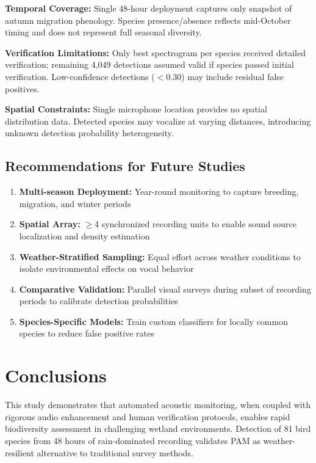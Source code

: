\documentclass[twocolumn]{article}
\begin{document}
\textbf{Temporal Coverage:} Single 48-hour deployment captures only snapshot of autumn migration phenology. Species presence/absence reflects mid-October timing and does not represent full seasonal diversity.

\textbf{Verification Limitations:} Only best spectrogram per species received detailed verification; remaining 4,049 detections assumed valid if species passed initial verification. Low-confidence detections ($<$0.30) may include residual false positives.

\textbf{Spatial Constraints:} Single microphone location provides no spatial distribution data. Detected species may vocalize at varying distances, introducing unknown detection probability heterogeneity.

\subsection{Recommendations for Future Studies}

\begin{enumerate}
\item \textbf{Multi-season Deployment:} Year-round monitoring to capture breeding, migration, and winter periods

\item \textbf{Spatial Array:} $\geq$4 synchronized recording units to enable sound source localization and density estimation

\item \textbf{Weather-Stratified Sampling:} Equal effort across weather conditions to isolate environmental effects on vocal behavior

\item \textbf{Comparative Validation:} Parallel visual surveys during subset of recording periods to calibrate detection probabilities

\item \textbf{Species-Specific Models:} Train custom classifiers for locally common species to reduce false positive rates
\end{enumerate}

\section{Conclusions}

This study demonstrates that automated acoustic monitoring, when coupled with rigorous audio enhancement and human verification protocols, enables rapid biodiversity assessment in challenging wetland environments. Detection of 81 bird species from 48 hours of rain-dominated recording validates PAM as weather-resilient alternative to traditional survey methods.
\end{document}
